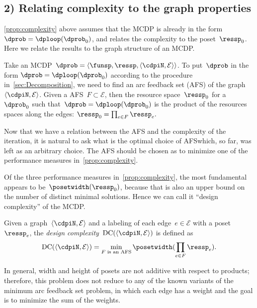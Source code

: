 \subsection{2) Relating complexity to the graph properties}

\cref{prop:complexity} above assumes that the MCDP is already in the
form $\dprob=\dploop(\dprob_{0})$, and relates the complexity to
the poset~$\ressp_{0}$. Here we relate the results to the graph
structure of an MCDP.

Take an MCDP~$\dprob=\left\langle \funsp,\ressp,\left\langle \cdpiN,\mathcal{E}\right\rangle \right\rangle $.
To put~$\dprob$ in the form $\dprob=\dploop(\dprob_{0})$ according
to the procedure in~\cref{sec:Decomposition}, we need to find an arc
feedback set (AFS) of the graph~$\left\langle \cdpiN,\mathcal{E}\right\rangle $.
Given a AFS~$F\subset\mathcal{E}$, then the resource space~$\ressp_{0}$
for a~$\dprob_{0}$ such that~$\dprob=\dploop(\dprob_{0})$ is the
product of the resources spaces along the edges: $\ressp_{0}=\prod_{e\in F}\ressp_{e}.$

Now that we have a relation between the AFS and the complexity of
the iteration, it is natural to ask what is the optimal choice of
AFS\textemdash which, so far, was left as an arbitrary choice. The
AFS should be chosen as to minimize one of the performance measures
in~\cref{prop:complexity}.

Of the three performance measures in~\cref{prop:complexity}, the most
fundamental appears to be~$\posetwidth(\ressp_{0})$, because that
is also an upper bound on the number of distinct minimal solutions.
Hence we can call it ``design complexity'' of the MCDP.
\begin{definition}
\label{def:design-complexity}Given a graph~$\left\langle \cdpiN,\mathcal{E}\right\rangle $
and a labeling of each edge~$e\in\mathcal{E}$ with a poset~$\ressp_{e}$,
the \emph{design complexity~}$\text{DC}(\left\langle \cdpiN,\mathcal{E}\right\rangle )$
is defined as
\begin{equation}
\text{DC}(\left\langle \cdpiN,\mathcal{E}\right\rangle )=\min_{F\text{ is an AFS}}\posetwidth(\prod_{e\in F}\ressp_{e}).\label{eq:complexity}
\end{equation}
\end{definition}
In general, width and height of posets are not additive with respect
to products; therefore, this problem does not reduce to any of the
known variants of the minimum arc feedback set problem, in which
each edge has a weight and the goal is to minimize the sum of the
weights.



